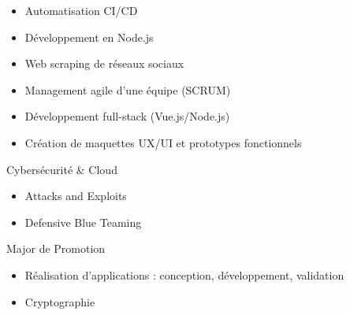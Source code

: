\documentclass[10pt,a4paper,ragged2e,withhyper]{altacv}
\begin{document}
\begin{paracol}{2}
\divider

\begin{itemize}
    \item Automatisation CI/CD
    \item Développement en Node.js
    \item Web scraping de réseaux sociaux
\end{itemize}

\divider

\begin{itemize}
    \item Management agile d'une équipe (SCRUM)
    \item Développement full-stack (Vue.js/Node.js)
    \item Création de maquettes UX/UI et prototypes fonctionnels
\end{itemize}


\switchcolumn



\divider



{\faLock} Cybersécurité \& Cloud\break
\begin{itemize}
    \item Attacks and Exploits
    \item Defensive Blue Teaming
\end{itemize}

\divider

{\faTrophy} Major de Promotion\break
\begin{itemize}
    \item Réalisation d'applications : conception, développement, validation
    \item Cryptographie
\end{itemize}


\end{paracol}
\end{document}

